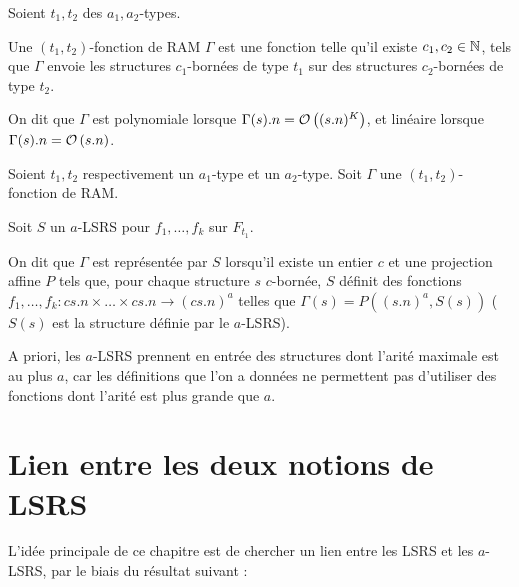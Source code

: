 			
			\begin{definition}
				\label{def:fonction_de_RAM_a}
				Soient $t_1, t_2$ des $a_1,a_2$-types. 
						
				Une $(t_1, t_2)$-fonction de RAM $\Gamma$ est une fonction telle qu'il existe $c_1, c_2 \in \mathbb{N}$, tels que $\Gamma$ envoie les structures $c_1$-bornées de type $t_1$ sur des structures $c_2$-bornées de type $t_2$\footnotemark.
				
				
				On dit que $\Gamma$ est polynomiale lorsque $\Gamma(s).n = \mathcal{O}\left( (s.n)^K \right)$, et linéaire lorsque $\Gamma(s).n = \mathcal{O}\left( s.n \right)$.
				
			\end{definition}
			
			
			\begin{definition}
				\label{def:representee_par_aLSRS}
				Soient $t_1, t_2$ respectivement un $a_1$-type et un $a_2$-type. Soit $\Gamma$ une $(t_1, t_2)$-fonction de RAM.
				
				Soit $S$ un $a$-LSRS pour $f_1, \dots, f_k$ sur $F_{t_1}$. 
				
				On dit que $\Gamma$ est représentée par $S$ lorsqu'il existe un entier $c$ et une projection affine $P$ tels que, pour chaque structure $s$ $c$-bornée, $S$ définit des fonctions $f_1, \dots, f_k : cs.n \times \dots \times cs.n \to (cs.n)^a$ telles que $\Gamma(s) = P((s.n)^a, S(s))$ ($S(s)$ est la structure définie par le $a$-LSRS).
			\end{definition}
			
			A priori, les $a$-LSRS prennent en entrée des structures dont l'arité maximale est au plus $a$, car les définitions que l'on a données ne permettent pas d'utiliser des fonctions dont l'arité est plus grande que $a$. 
			
			
			
			
			
	
		
	\section{Lien entre les deux notions de LSRS}
	\label{sec:lien_LSRS_aLSRS}
	
	L'idée principale de ce chapitre est de chercher un lien entre les LSRS et les $a$-LSRS, par le biais du résultat suivant :
	
